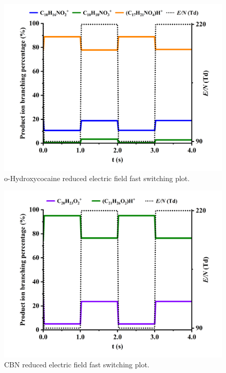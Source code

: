 \begin{figure}[htb]
\centering
\includegraphics[width=0.80\linewidth]{pics/other_drugs/ohcocaine-fs-90-220.png}
\caption{o-Hydroxycocaine reduced electric field fast switching plot.}
\label{fig:DR_ohcocaine_fs}
\end{figure}



\begin{figure}[htb]
\centering
\includegraphics[width=0.80\linewidth]{pics/other_drugs/CBN-fs-90-220.png}
\caption{CBN reduced electric field fast switching plot.}
\label{fig:DR_CBN_fs}
\end{figure}



